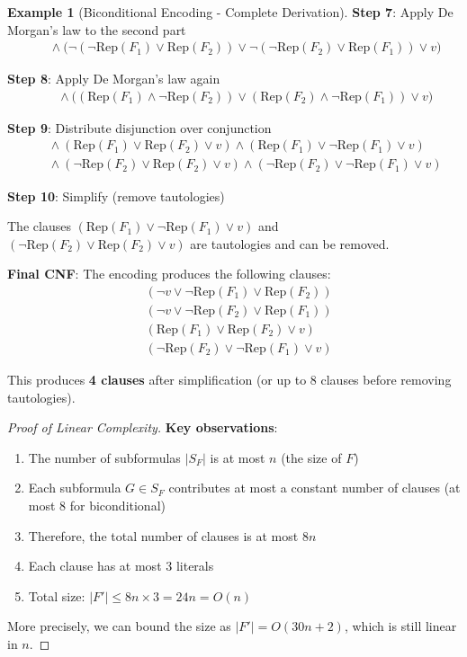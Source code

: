 \documentclass[11pt,a4paper]{article}
\theoremstyle{definition}
\newtheorem{example}{Example}[section]
\theoremstyle{plain}
\theoremstyle{remark}
\begin{document}
\begin{example}[Biconditional Encoding - Complete Derivation]
\textbf{Step 7}: Apply De Morgan's law to the second part
\begin{align*}
&\quad \land \big(\neg(\neg \text{Rep}(F_1) \lor \text{Rep}(F_2)) \lor \neg(\neg \text{Rep}(F_2) \lor \text{Rep}(F_1)) \lor v\big)
\end{align*}

\textbf{Step 8}: Apply De Morgan's law again
\begin{align*}
&\quad \land \big((\text{Rep}(F_1) \land \neg \text{Rep}(F_2)) \lor (\text{Rep}(F_2) \land \neg \text{Rep}(F_1)) \lor v\big)
\end{align*}

\textbf{Step 9}: Distribute disjunction over conjunction
\begin{align*}
&\quad \land (\text{Rep}(F_1) \lor \text{Rep}(F_2) \lor v) \land (\text{Rep}(F_1) \lor \neg \text{Rep}(F_1) \lor v) \\
&\quad \land (\neg \text{Rep}(F_2) \lor \text{Rep}(F_2) \lor v) \land (\neg \text{Rep}(F_2) \lor \neg \text{Rep}(F_1) \lor v)
\end{align*}

\textbf{Step 10}: Simplify (remove tautologies)

The clauses $(\text{Rep}(F_1) \lor \neg \text{Rep}(F_1) \lor v)$ and $(\neg \text{Rep}(F_2) \lor \text{Rep}(F_2) \lor v)$ are tautologies and can be removed.

\textbf{Final CNF}: The encoding produces the following clauses:
\begin{align*}
&(\neg v \lor \neg \text{Rep}(F_1) \lor \text{Rep}(F_2)) \\
&(\neg v \lor \neg \text{Rep}(F_2) \lor \text{Rep}(F_1)) \\
&(\text{Rep}(F_1) \lor \text{Rep}(F_2) \lor v) \\
&(\neg \text{Rep}(F_2) \lor \neg \text{Rep}(F_1) \lor v)
\end{align*}

This produces \textbf{4 clauses} after simplification (or up to 8 clauses before removing tautologies).
\end{example}

\begin{proof}[Proof of Linear Complexity]
\textbf{Key observations}:
\begin{enumerate}
    \item The number of subformulas $|S_F|$ is at most $n$ (the size of $F$)
    \item Each subformula $G \in S_F$ contributes at most a constant number of clauses (at most 8 for biconditional)
    \item Therefore, the total number of clauses is at most $8n$
    \item Each clause has at most 3 literals
    \item Total size: $|F'| \leq 8n \times 3 = 24n = O(n)$
\end{enumerate}

More precisely, we can bound the size as $|F'| = O(30n + 2)$, which is still linear in $n$.
\end{proof}
\end{document}
